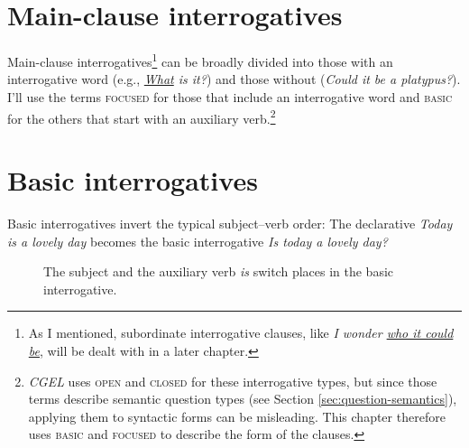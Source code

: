 \section{Main-clause interrogatives}

Main-clause interrogatives\footnote{As I mentioned, subordinate interrogative clauses, like \textit{I wonder \uline{who it could be}}, will be dealt with in a later chapter.} can be broadly divided into those with an interrogative word (e.g., \textit{\uline{What} is it?}) and those without (\textit{Could it be a platypus?}). I'll use the terms \textsc{focused} for those that include an interrogative word and \textsc{basic} for the others that start with an auxiliary verb.\footnote{\textit{CGEL} uses \textsc{open} and \textsc{closed} for these interrogative types, but since those terms describe semantic question types (see Section \ref{sec:question-semantics}), applying them to syntactic forms can be misleading. This chapter therefore uses \textsc{basic} and \textsc{focused} to describe the form of the clauses.}

\section{Basic interrogatives}\label{sec:basic-int}

Basic interrogatives invert the typical subject--verb order: The declarative \textit{Today is a lovely day} becomes the basic interrogative \textit{Is today a lovely day?} 

\begin{figure}
    \centering
    \caption{The subject and the auxiliary verb \textit{is} switch places in the basic interrogative.}
    \label{fig:subj-aux-inversion}
\end{figure}


